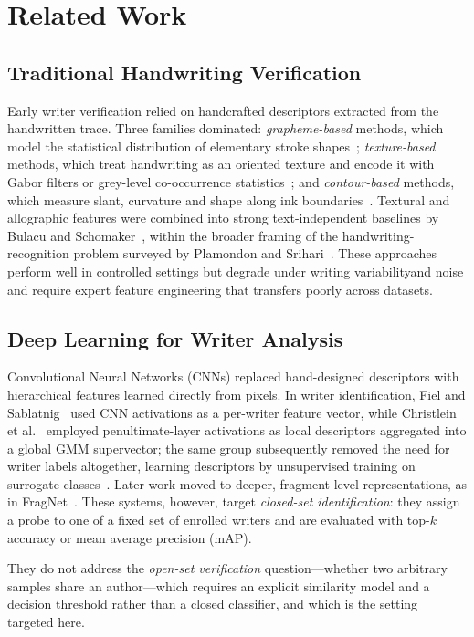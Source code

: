 \section{Related Work}
\label{sec:related}

\subsection{Traditional Handwriting Verification}
Early writer verification relied on handcrafted descriptors extracted from
the handwritten trace. Three families dominated: \emph{grapheme-based}
methods, which model the statistical distribution of elementary stroke
shapes~\cite{bensefia2005}; \emph{texture-based} methods, which treat
handwriting as an oriented texture and encode it with Gabor filters or
grey-level co-occurrence statistics~\cite{said2000}; and
\emph{contour-based} methods, which measure slant, curvature and shape
along ink boundaries~\cite{schomaker2004}. Textural and
allographic features were combined into strong text-independent baselines by
Bulacu and Schomaker~\cite{bulacu2007}, within the broader framing of the
handwriting-recognition problem surveyed by Plamondon and
Srihari~\cite{plamondon2000}. These approaches perform well in controlled
settings but degrade under writing variabilityand noise and
require expert feature engineering that transfers poorly across datasets.

\subsection{Deep Learning for Writer Analysis}
Convolutional Neural Networks (CNNs) replaced hand-designed descriptors with
hierarchical features learned directly from pixels. In writer identification,
Fiel and Sablatnig~\cite{fiel2015} used CNN activations as a per-writer
feature vector, while Christlein et al.~\cite{christlein2015} employed
penultimate-layer activations as local descriptors aggregated into a global
GMM supervector; the same group subsequently removed the need for writer
labels altogether, learning descriptors by unsupervised training on
surrogate classes~\cite{christlein2017}. Later work moved to deeper,
fragment-level representations, as in FragNet~\cite{he2020fragnet}. These
systems, however, target \emph{closed-set identification}: they assign a
probe to one of a fixed set of enrolled writers and are evaluated with
top-$k$ accuracy or mean average precision (mAP).

They do not
address the \emph{open-set verification} question—whether two arbitrary
samples share an author—which requires an explicit similarity model and a
decision threshold rather than a closed classifier, and which is the setting
targeted here.

